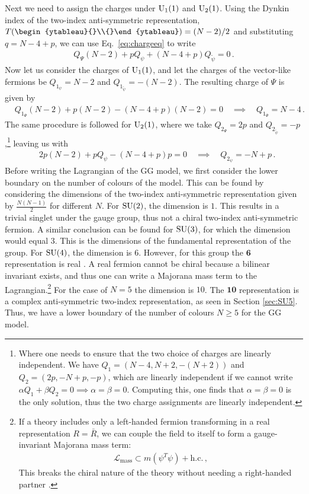 Next we need to assign the charges under $\mathrm{U}_1(1)$ and $\mathrm{U}_2(1)$. Using the Dynkin index of the two-index anti-symmetric representation, $T(\begin{ytableau}{}\\{}\end{ytableau})=(N-2)/2$ and substituting $q=N-4+p$, we can use Eq.~\eqref{eq:chargeeq} to write
\begin{align}
     Q_\Psi (N-2) + p Q_\psi + (N-4+p) Q_{\tilde{\psi}} = 0\,.
\end{align}
Now let us consider the charges of $\mathrm{U}_1(1)$, and let the charges of the vector-like fermions be $Q_{1_\psi}=N-2$ and $Q_{1_{\tilde{\psi}}}=-(N-2)$. The resulting charge of $\Psi$ is given by
\begin{align}
     &Q_{1_\Psi} (N-2) + p (N-2) - (N-4+p) (N-2) = 0\quad\implies\quad Q_{1_\Psi}=N-4\,.
\end{align}
The same procedure is followed for $\mathrm{U}_2(1)$, where we take $Q_{2_\Psi}=2p$ and $Q_{2_{\tilde{\psi}}}=-p$,\footnote{Where one needs to ensure that the two choice of charges are linearly independent. We have $Q_1=(N-4,N+2,-(N+2))$ and $Q_2=(2p,-N+p,-p)$, which are linearly independent if we cannot write $\alpha Q_1+\beta Q_2=0\implies \alpha=\beta=0$. Computing this, one finds that $\alpha=\beta=0$ is the only solution, thus the two charge assignments are linearly independent.} leaving us with
\begin{align}
     &2p(N-2) + p Q_\psi - (N-4+p) p = 0\quad\implies\quad Q_{2_\psi}=-N+p\,.
\end{align}
Before writing the Lagrangian of the GG model, we first consider the lower boundary on the number of colours of the model. This can be found by considering the dimensions of the two-index anti-symmetric representation given by $\frac{N(N-1)}{2}$ for different $N$. For $\mathrm{SU}(2)$, the dimension is $1$. This results in a trivial singlet under the gauge group, thus not a chiral two-index anti-symmetric fermion. A similar conclusion can be found for $\mathrm{SU}(3)$, for which the dimension would equal $3$. This is the dimensions of the fundamental representation of the group. For $\mathrm{SU}(4)$, the dimension is $6$. However, for this group the $\mathbf{6}$ representation is real \cite{Georgi:1999wka}. A real fermion cannot be chiral because a bilinear invariant exists, and thus one can write a Majorana mass term to the Lagrangian.\footnote{If a theory includes only a left-handed fermion transforming in a real representation $R=\bar{R}$, we can couple the field to itself to form a gauge-invariant Majorana mass term: \begin{align} \mathcal{L}_{\text{mass}}\subset m(\psi^T\psi)+\text{h.c}.\,,\end{align} This breaks the chiral nature of the theory without needing a right-handed partner \cite{Lancaster:2014}.} For the case of $N=5$ the dimension is $10$. The $\mathbf{10}$ representation is a complex anti-symmetric two-index representation, as seen in Section \ref{sec:SU5}. Thus, we have a lower boundary of the number of colours $N\ge5$ for the GG model.

